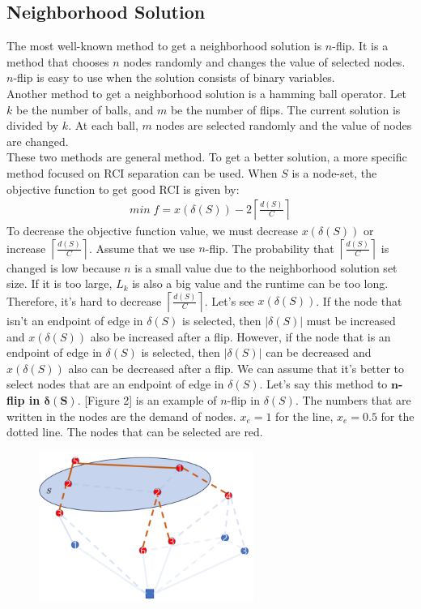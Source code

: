 \documentclass[11pt]{article}
\begin{document}
\begin{spacing}{1.5}
{\centering\subsection{Neighborhood Solution}}
The most well-known method to get a neighborhood solution is $n$-flip. It is a method that chooses $n$ nodes randomly and changes the value of selected nodes. $n$-flip is easy to use when the solution consists of binary variables.\\
\indent Another method to get a neighborhood solution is a hamming ball operator. Let $k$ be the number of balls, and $m$ be the number of flips. The current solution is divided by $k$. At each ball, $m$ nodes are selected randomly and the value of nodes are changed.\\
\indent These two methods are general method. To get a better solution, a more specific method focused on RCI separation can be used. When $S$ is a node-set, the objective function to get good RCI is given by:
\begin{align}
    min\;f=x(\delta(S))-2\left\lceil\frac{d(S)}{C}\right\rceil
\end{align}
To decrease the objective function value, we must decrease $x(\delta(S))$ or increase $\left\lceil\frac{d(S)}{C}\right\rceil$. Assume that we use $n$-flip. The probability that $\left\lceil\frac{d(S)}{C}\right\rceil$ is changed is low because $n$ is a small value due to the neighborhood solution set size. If it is too large, $L_k$ is also a big value and the runtime can be too long. Therefore, it's hard to decrease $\left\lceil\frac{d(S)}{C}\right\rceil$. Let's see $x(\delta(S))$. If the node that isn't an endpoint of edge in $\delta(S)$ is selected, then $|\delta(S)|$ must be increased and $x(\delta(S))$ also be increased after a flip. However, if the node that is an endpoint of edge in $\delta(S)$ is selected, then $|\delta(S)|$ can be decreased and $x(\delta(S))$ also can be decreased after a flip. We can assume that it's better to select nodes that are an endpoint of edge in $\delta(S)$. Let's say this method to \textbf{$\boldsymbol{n}$-flip in $\boldsymbol{\delta(S)}$}. [Figure 2] is an example of $n$-flip in $\delta(S)$. The numbers that are written in the nodes are the demand of nodes. $x_e = 1$ for the line, $x_e = 0.5$ for the dotted line. The nodes that can be selected are red. 
\begin{figure}[htb!]
    \centerline{\includegraphics[width=7cm]{image2.png}}

\end{figure}
\end{spacing}
\end{document}
